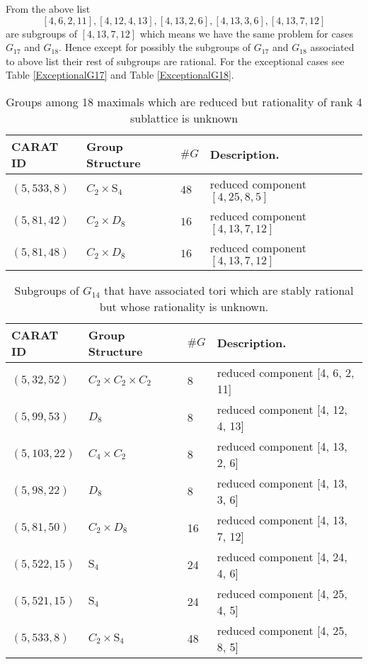 \documentclass[12pt]{article}
\theoremstyle{plain}
\theoremstyle{definition}
\begin{document}
From the above list $$[4, 6, 2, 11], [4, 12, 4, 13], [4, 13, 2, 6], [4, 13, 3, 6], [4, 13, 7, 12]$$ are subgroups of $[4, 13, 7, 12]$ which means we have the same problem for cases $G_{17}$ and $G_{18}$. Hence except for possibly the subgroups of $G_{17}$ and $G_{18}$ associated to above list their rest of subgroups are rational. For the exceptional cases see Table \ref{ExceptionalG17} and Table \ref{ExceptionalG18}.
 \begin{table}
\centering
\begin{tabular}{lllll}
CARAT ID & Group Structure & $\#G$ & Description.\\\hline
 $(5,533,8)$ & $C_2\times \mathrm{S}_4$ & $48$  & reduced component $[ 4, 25, 8, 5 ]$ &\\
 $(5,81,42)$ & $C_2\times D_8$ & $16$  & reduced component $[ 4, 13, 7, 12 ]$&\\
 $(5,81,48)$ & $C_2\times D_8$ & $16$  & reduced component $[ 4, 13, 7, 12 ]$ &
\end{tabular}
\caption{Groups among 18 maximals which are reduced but rationality of rank 4 sublattice is unknown}
\label{Tbl:RationalityUnknown} 
\end{table}
\begin{table}
\centering
\begin{tabular}{llll}
CARAT ID & Group Structure & $\#G$ & Description.\\\hline
$( 5, 32, 52)$ &	$C_2 \times C_2 \times C_2$& 8 &reduced component 	[4, 6, 2, 11]\\
$( 5, 99, 53 )$ &	$D_8$ & 8&	reduced component [4, 12, 4, 13]\\
$( 5, 103, 22 )$ & $C_4 \times C_2$& 8 &reduced component [4, 13, 2, 6]\\
$( 5, 98, 22 )$& 	$D_8$ & 8&	reduced component [4, 13, 3, 6]\\
$( 5, 81, 50 )$ &		$C_2 \times D_8$ & 16& reduced component [4, 13, 7, 12]\\
$( 5, 522, 15)$ &	$\mathrm{S}_4$& 24&	reduced component 	[4, 24, 4, 6]\\
$( 5, 521, 15 )$ &		$\mathrm{S}_4$ &24&		reduced component [4, 25, 4, 5]\\
$( 5, 533, 8 )$&		$C_2 \times	 \mathrm{S}_4$ & 48&		reduced component [4, 25, 8, 5]
\end{tabular}
\caption{Subgroups of $G_{14}$ that have associated tori which are stably rational but whose rationality is unknown.}
\label{ExceptionalG14}
\end{table}
\end{document}
